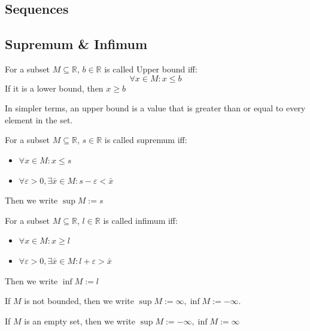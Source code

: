 \documentclass{article}
\newcommand{\R}{\mathbb{R}}
\begin{document}
\subsection{Sequences}
\subsection{Supremum \& Infimum}

\begin{definition}
	For a subset $M\subseteq \R$, $b\in \R$ is called Upper bound iff:
	\begin{equation*}
		\forall x\in M: x\leq b
	\end{equation*}
	If it is a lower bound, then $x\geq b$
\end{definition}

In simpler terms, an upper bound is a value that is greater than or equal to every element in the set.

\begin{definition}
	For a subset $M\subseteq \R$, $s\in \R$ is called supremum iff:
	\begin{itemize}
		\item $\forall x\in M: x\leq s$
		\item $\forall \varepsilon >0, \exists \bar{x}\in M : s-\varepsilon< \bar{x}$
	\end{itemize}
	Then we write $\sup M := s$
\end{definition}



\begin{definition}
		For a subset $M\subseteq \R$, $l\in \R$ is called infimum iff:
	\begin{itemize}
		\item $\forall x\in M: x\geq l$
		\item $\forall \varepsilon >0, \exists \bar{x}\in M : l+\varepsilon> \bar{x}$
	\end{itemize}
	Then we write $\inf M := l$
\end{definition}

\begin{remark}
	If $M$ is not bounded, then we write $\sup M:= \infty, \inf M:=-\infty $.
	
	If $M$ is an empty set, then we write $\sup M:= -\infty, \inf M:=\infty$
\end{remark}





\end{document}
